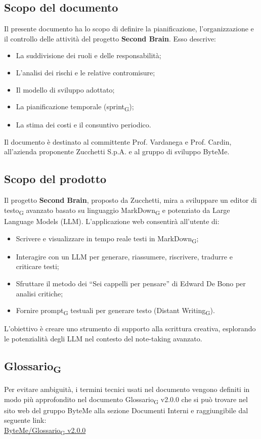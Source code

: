\documentclass[11pt,a4paper]{article}
\newcommand{\gls}[1]{#1\textsubscript{G}}
\begin{document}
\subsection{Scopo del documento}
Il presente documento ha lo scopo di definire la pianificazione, l’organizzazione e il controllo delle attività del progetto \textbf{Second Brain}. Esso descrive:
\begin{itemize}
    \item La suddivisione dei ruoli e delle responsabilità;
    \item L’analisi dei rischi e le relative contromisure;
    \item Il modello di sviluppo adottato;
    \item La pianificazione temporale (\gls{sprint});
    \item La stima dei costi e il consuntivo periodico.
\end{itemize}
Il documento è destinato al committente Prof. Vardanega e Prof. Cardin, all'azienda proponente Zucchetti S.p.A. e al gruppo di sviluppo ByteMe.

\subsection{Scopo del prodotto}
Il progetto \textbf{Second Brain}, proposto da Zucchetti, mira a sviluppare un \gls{editor di testo} avanzato basato su linguaggio \gls{MarkDown} e potenziato da Large Language Models (LLM). L’applicazione web consentirà all’utente di:
\begin{itemize}
    \item Scrivere e visualizzare in tempo reale testi in \gls{MarkDown};
    \item Interagire con un LLM per generare, riassumere, riscrivere, tradurre e criticare testi;
    \item Sfruttare il metodo dei “Sei cappelli per pensare” di Edward De Bono per analisi critiche;
    \item Fornire \gls{prompt} testuali per generare testo (\gls{Distant Writing}).
\end{itemize}
L’obiettivo è creare uno strumento di supporto alla scrittura creativa, esplorando le potenzialità degli LLM nel contesto del note-taking avanzato.

\subsection{\gls{Glossario}}
Per evitare ambiguità, i termini tecnici usati nel documento vengono definiti in modo più approfondito nel documento \gls{Glossario} v2.0.0 che si può trovare nel sito web del gruppo ByteMe alla sezione Documenti Interni e raggiungibile dal seguente link:\\
\href{https://byteme25.github.io/ByteMe/files.html}{ByteMe/\gls{Glossario} v2.0.0}
\end{document}
